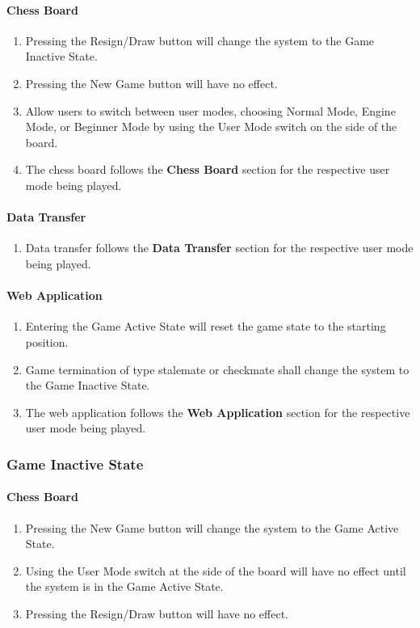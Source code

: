 \documentclass[12pt]{article}
\begin{document}
\paragraph{Chess Board}
\begin{enumerate}[{GA}1., leftmargin=2\parindent]
    \item Pressing the Resign/Draw button will change the system to the Game Inactive State.
    \item Pressing the New Game button will have no effect.
    \item Allow users to switch between user modes, choosing Normal Mode, Engine Mode, or Beginner Mode by using the User Mode switch on the side of the board.
    \item The chess board follows the \textbf{Chess Board} section for the respective user mode being played.
\end{enumerate}

\paragraph{Data Transfer}
\begin{enumerate}[{GA}1., leftmargin=2\parindent, resume]
    \item Data transfer follows the \textbf{Data Transfer} section for the respective user mode being played.
\end{enumerate}

\paragraph{Web Application}
\begin{enumerate}[{GA}1., leftmargin=2\parindent, resume]
    \item Entering the Game Active State will reset the game state to the starting position.
    \item Game termination of type stalemate or checkmate shall change the system to the Game Inactive State.
    \item The web application follows the \textbf{Web Application} section for the respective user mode being played.
\end{enumerate}

\subsubsection{Game Inactive State}
\paragraph{Chess Board}
\begin{enumerate}[{GI}1., leftmargin=2\parindent]
    \item Pressing the New Game button will change the system to the Game Active State.
    \item Using the User Mode switch at the side of the board will have no effect until the system is in the Game Active State.
    \item Pressing the Resign/Draw button will have no effect.
\end{enumerate}
\end{document}
